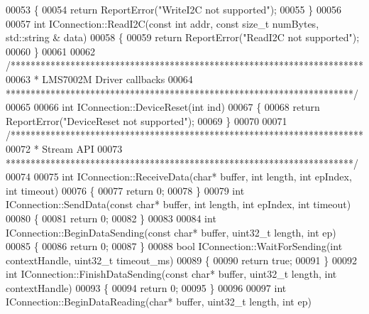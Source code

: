 \begin{DoxyCode}
00053 \{
00054     \textcolor{keywordflow}{return} ReportError(\textcolor{stringliteral}{"WriteI2C not supported"});
00055 \}
00056 
00057 \textcolor{keywordtype}{int} IConnection::ReadI2C(\textcolor{keyword}{const} \textcolor{keywordtype}{int} addr, \textcolor{keyword}{const} \textcolor{keywordtype}{size\_t} numBytes, std::string &
      data)
00058 \{
00059     \textcolor{keywordflow}{return} ReportError(\textcolor{stringliteral}{"ReadI2C not supported"});
00060 \}
00061 
00062 \textcolor{comment}{/***********************************************************************}
00063 \textcolor{comment}{ * LMS7002M Driver callbacks}
00064 \textcolor{comment}{ **********************************************************************/}
00065 
00066 \textcolor{keywordtype}{int} IConnection::DeviceReset(\textcolor{keywordtype}{int} ind)
00067 \{
00068     \textcolor{keywordflow}{return} ReportError(\textcolor{stringliteral}{"DeviceReset not supported"});
00069 \}
00070 
00071 \textcolor{comment}{/***********************************************************************}
00072 \textcolor{comment}{ * Stream API}
00073 \textcolor{comment}{ **********************************************************************/}
00074 
00075 \textcolor{keywordtype}{int} IConnection::ReceiveData(\textcolor{keywordtype}{char}* buffer, \textcolor{keywordtype}{int} length, \textcolor{keywordtype}{int} epIndex, \textcolor{keywordtype}{int} timeout)
00076 \{
00077     \textcolor{keywordflow}{return} 0;   
00078 \}
00079 \textcolor{keywordtype}{int} IConnection::SendData(\textcolor{keyword}{const} \textcolor{keywordtype}{char}* buffer, \textcolor{keywordtype}{int} length, \textcolor{keywordtype}{int} epIndex, \textcolor{keywordtype}{int} timeout)
00080 \{
00081     \textcolor{keywordflow}{return} 0;
00082 \}
00083 
00084 \textcolor{keywordtype}{int} IConnection::BeginDataSending(\textcolor{keyword}{const} \textcolor{keywordtype}{char}* buffer, uint32\_t length, \textcolor{keywordtype}{int} ep)
00085 \{
00086     \textcolor{keywordflow}{return} 0;
00087 \}
00088 \textcolor{keywordtype}{bool} IConnection::WaitForSending(\textcolor{keywordtype}{int} contextHandle, uint32\_t timeout_ms)
00089 \{
00090     \textcolor{keywordflow}{return} \textcolor{keyword}{true};
00091 \}
00092 \textcolor{keywordtype}{int} IConnection::FinishDataSending(\textcolor{keyword}{const} \textcolor{keywordtype}{char}* buffer, uint32\_t length, \textcolor{keywordtype}{int} contextHandle)
00093 \{
00094     \textcolor{keywordflow}{return} 0;
00095 \}
00096 
00097 \textcolor{keywordtype}{int} IConnection::BeginDataReading(\textcolor{keywordtype}{char}* buffer, uint32\_t length, \textcolor{keywordtype}{int} ep)

\end{DoxyCode}
